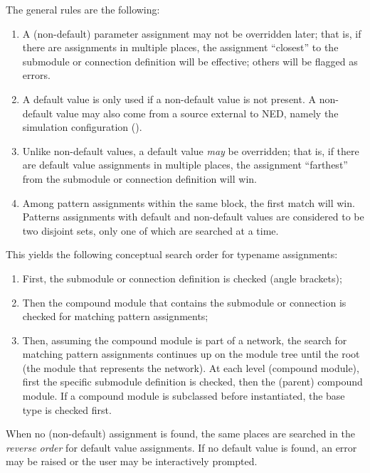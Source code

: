 The general rules are the following:

\begin{enumerate}
  \item A (non-default) parameter assignment may not be overridden later;
    that is, if there are assignments in multiple places, the assignment
    ``closest'' to the submodule or connection definition will be effective;
    others will be flagged as errors.
  \item A default value is only used if a non-default value is not present.
    A non-default value may also come from a source external to NED, namely
    the simulation configuration ().
  \item Unlike non-default values, a default value \textit{may} be overridden;
    that is, if there are default value assignments in multiple places,
    the assignment ``farthest'' from the submodule or connection definition will win.
  \item Among pattern assignments within the same 
    block, the first match will win. Patterns assignments with default and
    non-default values are considered to be two disjoint sets, only one of
    which are searched at a time.
\end{enumerate}

This yields the following conceptual search order for typename assignments:

\begin{enumerate}
   \item First, the submodule or connection definition is checked (angle brackets);
   \item Then the compound module that contains the submodule or connection is
     checked for matching pattern assignments;
   \item Then, assuming the compound module is part of a network, the search
     for matching pattern assignments continues up on the module tree until the root
     (the module that represents the network). At each level (compound module),
     first the specific submodule definition is checked, then the (parent) compound module.
     If a compound module is subclassed before instantiated, the base type is checked
     first.
\end{enumerate}

When no (non-default) assignment is found, the same places are searched in the
\textit{reverse order} for default value assignments. If no default value is
found, an error may be raised or the user may be interactively prompted.

